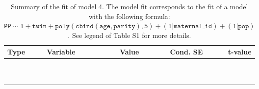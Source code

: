 \begin{table}[H]

\caption{\label{tab:tab4}Summary of the fit of model 4. The model fit corresponds to the fit of a model with the following formula: {\small$\mathtt{PP \sim 1 + twin + poly(cbind(age, parity), 5) + (1 | maternal\_id) + (1 | pop)}$}. See legend of Table S1 for more details.}
\centering
\fontsize{8}{10}\selectfont
\begin{tabular}[t]{>{\raggedright\arraybackslash}p{3cm}>{\raggedright\arraybackslash}p{5cm}rrr}
\toprule
Type & Variable & Value & Cond. SE & t-value\\
\midrule
\cellcolor{gray!6}{fixed effects} & \cellcolor{gray!6}{$\beta_1$} & \cellcolor{gray!6}{1.57} & \cellcolor{gray!6}{0.179} & \cellcolor{gray!6}{8.74}\\
\cellcolor{gray!6}{} & \cellcolor{gray!6}{$\beta_{\mathtt{twin}}$} & \cellcolor{gray!6}{-0.412} & \cellcolor{gray!6}{0.0636} & \cellcolor{gray!6}{-6.47}\\
\cellcolor{gray!6}{} & \cellcolor{gray!6}{$\beta_{\mathtt{age}}$} & \cellcolor{gray!6}{-420} & \cellcolor{gray!6}{59.7} & \cellcolor{gray!6}{-7.04}\\
\cellcolor{gray!6}{} & \cellcolor{gray!6}{$\beta_{\mathtt{age}^2}$} & \cellcolor{gray!6}{-185} & \cellcolor{gray!6}{51.7} & \cellcolor{gray!6}{-3.57}\\
\cellcolor{gray!6}{} & \cellcolor{gray!6}{$\beta_{\mathtt{age}^3}$} & \cellcolor{gray!6}{-43.7} & \cellcolor{gray!6}{32.6} & \cellcolor{gray!6}{-1.34}\\
\cellcolor{gray!6}{} & \cellcolor{gray!6}{$\beta_{\mathtt{age}^4}$} & \cellcolor{gray!6}{-15.7} & \cellcolor{gray!6}{14.3} & \cellcolor{gray!6}{-1.09}\\
\cellcolor{gray!6}{} & \cellcolor{gray!6}{$\beta_{\mathtt{age}^5}$} & \cellcolor{gray!6}{2.47} & \cellcolor{gray!6}{9.7} & \cellcolor{gray!6}{0.255}\\
\cellcolor{gray!6}{} & \cellcolor{gray!6}{$\beta_{\mathtt{parity}}$} & \cellcolor{gray!6}{49.1} & \cellcolor{gray!6}{97.6} & \cellcolor{gray!6}{0.502}\\
\cellcolor{gray!6}{} & \cellcolor{gray!6}{$\beta_{\mathtt{age}\times\mathtt{parity}}$} & \cellcolor{gray!6}{12922} & \cellcolor{gray!6}{39528} & \cellcolor{gray!6}{0.327}\\
\cellcolor{gray!6}{} & \cellcolor{gray!6}{$\beta_{\mathtt{age}^2\times\mathtt{parity}}$} & \cellcolor{gray!6}{-33721} & \cellcolor{gray!6}{30550} & \cellcolor{gray!6}{-1.1}\\

\end{tabular}
\end{table}
